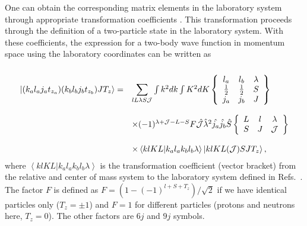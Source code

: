 \begin{enumerate}
One can obtain the corresponding matrix elements in the laboratory system
through appropriate transformation coefficients \cite{balian69,wc72,kkr79}. This transformation proceeds through the definition
of a two-particle state in the laboratory system.
With these coefficients,
the expression for a two-body wave function in momentum space
using the laboratory coordinates can be written as
\begin{equation}
   \begin{array}{ll}
     &\\
     \left | (k_al_aj_at_{z_a})(k_bl_bj_bt_{z_b})JT_z\right \rangle =&
      {\displaystyle \sum_{lL\lambda S{\cal J}}}\int k^{2}dk\int K^{2}dK
      \left\{\begin{array}{ccc}
      l_a&l_b&\lambda\\\frac{1}{2}&\frac{1}{2}&S\\
      j_a&j_b&J\end{array}
      \right\}\\&\\
      &\times (-1)^{\lambda +{\cal J}-L-S}
      F\hat{{\cal J}}\hat{\lambda}^{2}
      \hat{j_{a}}\hat{j_{b}}\hat{S}
      \left\{\begin{array}{ccc}L&l&\lambda\\S&J&{\cal J}
      \end{array}\right\}\\&\\
      &\times \left\langle klKL| k_al_ak_bl_b\lambda\right\rangle
      \left | klKL({\cal J})SJT_z\right \rangle ,
   \end{array}
   \label{eq:relcm-lab}
\end{equation}
where $\left\langle klKL| k_al_ak_bl_b\lambda\right\rangle$
is the transformation coefficient (vector bracket) from the relative and center of mass system 
to the laboratory system  defined in Refs.~\cite{wc72,kkr79}.
The factor $F$ is defined as $F=(1-(-1)^{l+S+T_z})/\sqrt{2}$ if
we have identical particles only ($T_z=\pm 1$) and $F=1$ for 
different particles (protons and neutrons here, $T_z=0$). The other factors are $6j$ and $9j$ symbols.



\end{enumerate}
